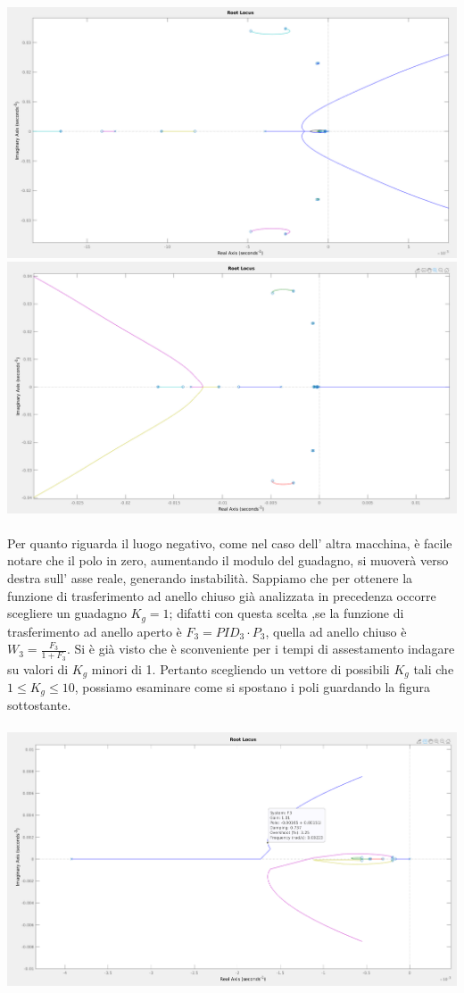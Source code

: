 \documentclass[Lau,noexaminfo]{sapthesis}
\begin{document}
	\includegraphics[scale=0.28]{rlocus_F3_pos}\\
	\includegraphics[scale=0.28]{rlocus_F3_neg}\\\\
	Per quanto riguarda il luogo negativo, come nel caso dell' altra macchina, è facile notare che il polo in zero, aumentando il modulo del guadagno, si muoverà verso destra sull' asse reale, generando instabilità. Sappiamo che per ottenere la funzione di trasferimento ad anello chiuso già analizzata in precedenza occorre scegliere un guadagno $K_g=1$; difatti con questa scelta ,se la funzione di trasferimento ad anello aperto è $F_3=PID_3\cdot P_3$, quella ad anello chiuso è $W_3=\frac{F_3}{1+F_3}$. Si è già visto che è sconveniente per i tempi di assestamento indagare su valori di $K_g$ minori di 1. Pertanto scegliendo un vettore di possibili $K_g$ tali che $1\le K_g \le 10$, possiamo esaminare come si spostano i poli guardando la figura sottostante.\\\\
	\includegraphics[scale=0.258]{rlocus_F3_particolare}\\\\
\end{document}
